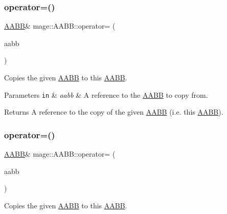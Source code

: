 \subsubsection{\texorpdfstring{operator=()}{operator=()}\hspace{0.1cm}{\footnotesize\ttfamily [1/2]}}
{\footnotesize\ttfamily \hyperlink{structmage_1_1_a_a_b_b}{A\+A\+BB}\& mage\+::\+A\+A\+B\+B\+::operator= (\begin{DoxyParamCaption}\item[{const \hyperlink{structmage_1_1_a_a_b_b}{A\+A\+BB} \&}]{aabb }\end{DoxyParamCaption})\hspace{0.3cm}{\ttfamily [default]}}

Copies the given \hyperlink{structmage_1_1_a_a_b_b}{A\+A\+BB} to this \hyperlink{structmage_1_1_a_a_b_b}{A\+A\+BB}.


\begin{DoxyParams}[1]{Parameters}
\mbox{\tt in}  & {\em aabb} & A reference to the \hyperlink{structmage_1_1_a_a_b_b}{A\+A\+BB} to copy from. \\
\hline
\end{DoxyParams}
\begin{DoxyReturn}{Returns}
A reference to the copy of the given \hyperlink{structmage_1_1_a_a_b_b}{A\+A\+BB} (i.\+e. this \hyperlink{structmage_1_1_a_a_b_b}{A\+A\+BB}). 
\end{DoxyReturn}
\hypertarget{structmage_1_1_a_a_b_b_a5ca72f9aabc219cd598af6eab6b8b99f}{}\label{structmage_1_1_a_a_b_b_a5ca72f9aabc219cd598af6eab6b8b99f} 
\subsubsection{\texorpdfstring{operator=()}{operator=()}\hspace{0.1cm}{\footnotesize\ttfamily [2/2]}}
{\footnotesize\ttfamily \hyperlink{structmage_1_1_a_a_b_b}{A\+A\+BB}\& mage\+::\+A\+A\+B\+B\+::operator= (\begin{DoxyParamCaption}\item[{\hyperlink{structmage_1_1_a_a_b_b}{A\+A\+BB} \&\&}]{aabb }\end{DoxyParamCaption})\hspace{0.3cm}{\ttfamily [default]}}

Copies the given \hyperlink{structmage_1_1_a_a_b_b}{A\+A\+BB} to this \hyperlink{structmage_1_1_a_a_b_b}{A\+A\+BB}.


